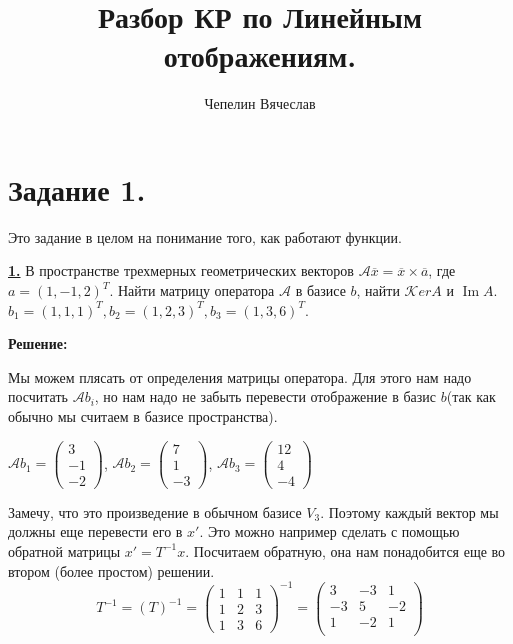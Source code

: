 \documentclass{article}
\title{Разбор КР по Линейным отображениям.}
\author{Чепелин Вячеслав}
\date{}
\makeatletter
\newcommand{\deff}[1]{\underline{\textbf{#1}}}
\DeclareMathOperator{\@custom@Im}{Im}
\renewcommand{\Im}{\@custom@Im}
\renewcommand{\ker}{\mathcal{K}er}
\makeatother
\begin{document}
\maketitle
\tableofcontents
\newpage

\section{Задание 1.}

Это задание в целом на понимание того, как работают функции.

\deff{1.} В пространстве трехмерных геометрических векторов $\mathcal{A}\overline{x} = \overline{x}\times \overline{a}$, где $a = (1,-1, 2)^T$. Найти матрицу оператора $\mathcal{A}$ в базисе $b$, найти $\ker A$ и $\Im A$. $b_1 = (1,1,1)^T, b_2= (1,2,3)^T, b_3 = (1,3,6)^T$.

\textbf{Решение:}

Мы можем плясать от определения матрицы оператора. Для этого нам надо посчитать $\mathcal{A}b_i$, но нам надо не забыть перевести отображение в базис $b$(так как обычно мы считаем в базисе пространства).

$\mathcal{A}b_1 = \begin{pmatrix}
    3 \\
    -1 \\
    -2
\end{pmatrix}$,
$\mathcal{A}b_2 = \begin{pmatrix}
    7 \\
    1 \\
    -3
\end{pmatrix}$, $\mathcal{A}b_3 = \begin{pmatrix}
    12\\
    4\\
    -4
\end{pmatrix}$

Замечу, что это произведение в обычном базисе $V_3$. Поэтому каждый вектор мы должны еще перевести его в $x'$. Это можно например сделать с помощью обратной матрицы $x' = T^{-1}x$. Посчитаем обратную, она нам понадобится еще во втором (более простом) решении. 
$$T^{-1} = (T)^{-1} = \begin{pmatrix}
    1 & 1 & 1 \\
    1 & 2 & 3 \\
    1 & 3 & 6
\end{pmatrix}^{-1} = \begin{pmatrix}
    3 & -3 & 1 \\
    -3& 5 &-2 \\
    1 & -2 & 1 \\
\end{pmatrix}$$
\end{document}
